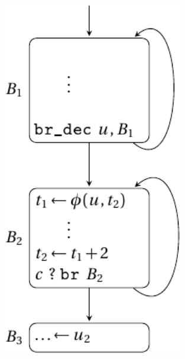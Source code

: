 \begin{figure}[t]
{\begin{minipage}{0.33\textwidth}
    \includegraphics[width=0.7\textwidth]{cexple-impossible-2.pdf}
  \end{minipage}
}
\hfill
{}
\end{figure}
